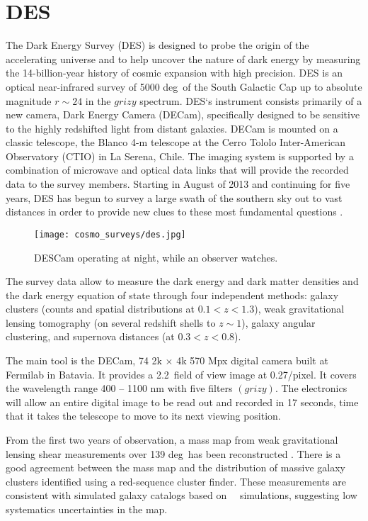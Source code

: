 \section{DES}
\label{DES}
The Dark Energy Survey (DES) is designed to probe the origin of the accelerating universe and to help uncover the nature of dark energy by measuring the \mbox{14-billion-year} history of cosmic expansion with high precision. DES is an optical near-infrared survey of 5000 deg\sq\ of the South Galactic Cap up to absolute magnitude $r\sim24$ in the $grizy$ spectrum. DES`s instrument consists primarily of a new camera, Dark Energy Camera (DECam), specifically designed to be sensitive to the highly redshifted light from distant galaxies. DECam is mounted on a classic telescope, the Blanco 4-m telescope at the Cerro Tololo Inter-American Observatory (CTIO) in La Serena, Chile. The imaging system is supported by a combination of microwave and optical data links that will provide the recorded data to the survey members. Starting in August of 2013 and continuing for five years, DES has begun to survey a large swath of the southern sky out to vast distances in order to provide new clues to these most fundamental questions \cite{DES}.

\begin{figure}[htb]
    \centering
    \texttt{[image: cosmo\_surveys/des.jpg]}
    \caption{DESCam operating at night, while an observer watches.}
    \label{fig:des}
\end{figure}
The survey data allow to measure the dark energy and dark matter densities and the dark energy equation of state through four independent methods: galaxy clusters (counts and spatial distributions at $0.1<z<1.3$), weak gravitational lensing tomography (on several redshift shells to $z\sim1$), galaxy angular clustering, and supernova distances (at $0.3<z<0.8$).

The main tool is the DECam, 74 2k $\times$ 4k 570 Mpx digital camera built at Fermilab in Batavia. It provides a 2.2\textdegree\ field of view image at 0.27\arcsec/pixel. It covers the wavelength range 400 -- 1100 nm with five filters $(grizy)$. The electronics will allow an entire digital image to be read out and recorded in 17 seconds, time that it takes the telescope to move to its next viewing position.

From the first two years of observation, a mass map from weak gravitational lensing shear measurements over 139 deg\sq\ has been reconstructed \cite{DES_mass}. There is a good agreement between the mass map and the distribution of massive galaxy clusters identified using a red-sequence cluster finder. These measurements are consistent with simulated galaxy catalogs based on \LCDM\ \nbody\ simulations, suggesting low systematics uncertainties in the map.


